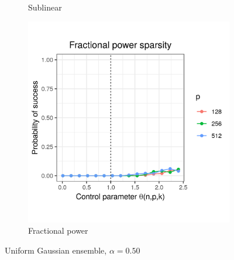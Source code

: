 \documentclass{beamer}
\begin{document}
\begin{frame}
\begin{figure}[h]
\begin{subfigure}{0.32\textwidth}
    \caption{Sublinear}
  \end{subfigure}
  \begin{subfigure}{0.32\textwidth}
    \includegraphics[width=0.9\linewidth]{uniform_fractional_power_sparsity_alpha_050}
    \caption{Fractional power}
  \end{subfigure}
  \caption{Uniform Gaussian ensemble, $\alpha = 0.50$}
\end{figure}

\end{frame}
\end{document}
